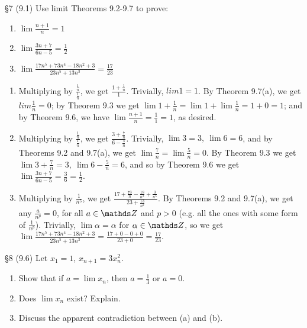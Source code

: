 \documentclass{homework}
\begin{document}
\begin{problem}{\S 7}
  (9.1) Use limit Theorems 9.2-9.7 to prove:
  \begin{enumerate}[label=(\alph*)]
    \item $\lim{\frac{n+1}{n}}=1$
    \item $\lim{\frac{3n+7}{6n-5}}=\frac{1}{2}$
    \item $\lim{\frac{17n^{5}+73n^{4}-18n^2+3}{23n^{5}+13n^3}}=\frac{17}{23}$
  \end{enumerate}
\end{problem}
\begin{solution}
  \begin{enumerate}[label=(\alph*)]
    \item 
      Multiplying by $\frac{\frac{1}{n}}{\frac{1}{n}}$, we get $\frac{1+\frac{1}{n}}{1}$. Trivially,
      $lim{1}=1$. By Theorem 9.7(a), we get $lim{\frac{1}{n}}=0$; by Theorem 9.3 we get
      $\lim{1+\frac{1}{n}}=\lim{1}+\lim{\frac{1}{n}}=1+0=1$; and by Theorem 9.6, we have
      $\lim{\frac{n+1}{n}}=\frac{1}{1}=1$, as desired.
    \item
      Multiplying by $\frac{\frac{1}{n}}{\frac{1}{n}}$, we get
      $\frac{3+\frac{7}{n}}{6-\frac{5}{n}}$. Trivially, $\lim{3}=3,\ \lim{6}=6$, and by Theorems 9.2
      and 9.7(a), we get $\lim{\frac{7}{n}}=\lim{\frac{5}{n}}=0$. By Theorem 9.3 we get
      $\lim{3+\frac{7}{n}}=3,\ \lim{6-\frac{5}{n}}=6$, and so by Theorem 9.6 we get 
      $\lim{\frac{3n+7}{6n-5}}=\frac{3}{6}=\frac{1}{2}$.
    \item Multiplying by $\frac{1}{n^{5}}$, we get
      $\frac{17+\frac{73}{n}-\frac{18}{n^3}+\frac{3}{n^{5}}}{23+\frac{13}{n^2}}$. By Theorems 9.2
      and 9.7(a), we get any $\frac{a}{n^{p}}=0$, for all $a\in \Z$ and $p>0$ (e.g. all the ones
      with some form of $\frac{1}{n^{p}}$). Trivially, $\lim{\alpha}=\alpha$ for $\alpha\in \Z$, so
      we get
      $\lim{\frac{17n^{5}+73n^{4}-18n^2+3}{23n^{5}+13n^3}}=\frac{17+0-0+0}{23+0}=\frac{17}{23}$.
  \end{enumerate}
\end{solution}

\begin{problem}{\S 8}
    (9.6) Let $x_1=1$, $x_{n+1}=3x_n^2$.
    \begin{enumerate}[label=(\alph*)]
      \item Show that if $a=\lim{x_n}$, then $a=\frac{1}{3}$ or $a=0$.
      \item Does $\lim{x_n}$ exist? Explain.
      \item Discuss the apparent contradiction between (a) and (b).
    \end{enumerate}
\end{problem}
\end{document}
